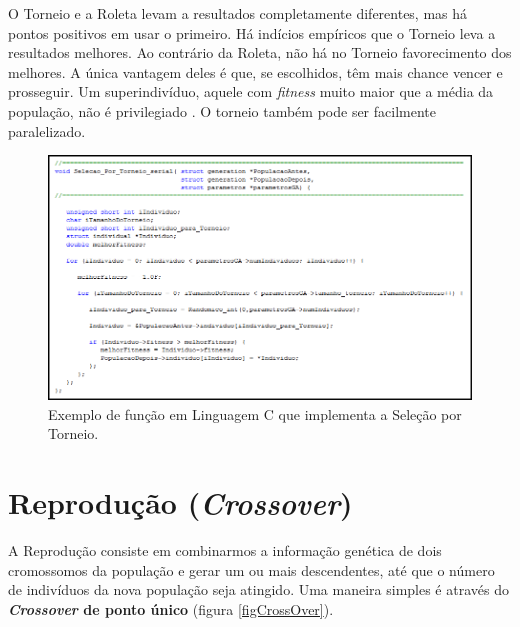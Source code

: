 	O Torneio e a Roleta levam a resultados completamente diferentes, mas há pontos positivos em usar o primeiro. Há indícios empíricos que o Torneio leva a resultados melhores. Ao contrário da Roleta, não há no Torneio favorecimento dos melhores. A única vantagem deles é que, se escolhidos, têm mais chance vencer e prosseguir. Um superindivíduo, aquele com \emph{fitness} muito maior que a média da população, não é privilegiado \cite{Linden2008}. O torneio também pode ser facilmente paralelizado.
	
	\begin{figure}[htp]
		\begin{center}
			\includegraphics[width=1.0\textwidth]{figs/ga/codigoSelecaoTorneio.png}
		\end{center}
		\caption{\label{fig:codigoSelecaoTorneio}Exemplo de função em Linguagem C que implementa a Seleção por Torneio.}
	\end{figure}
	
	
	\section{\label{crossover}Reprodução (\textit{Crossover})}

	A Reprodução consiste em combinarmos a informação genética de dois cromossomos da população e gerar um ou mais descendentes, até que o número de indivíduos da nova população seja atingido. Uma maneira simples é através do \textbf{\textit{Crossover} de ponto único} (figura \ref{figCrossOver}).
	
